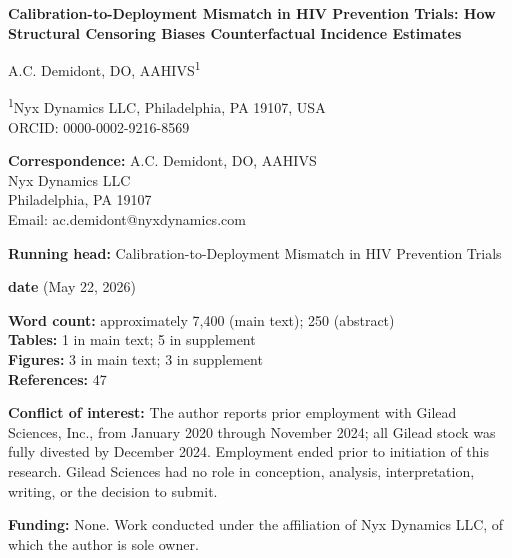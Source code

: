 \documentclass[12pt]{article}
\begin{document}
\thispagestyle{empty}
\begin{center}
\vspace*{0.5in}

{\Large \bfseries Calibration-to-Deployment Mismatch in HIV Prevention Trials: How Structural Censoring Biases Counterfactual Incidence Estimates}

\vspace{0.4in}

A.C. Demidont, DO, AAHIVS\textsuperscript{1}

\vspace{0.2in}

\small
\textsuperscript{1}Nyx Dynamics LLC, Philadelphia, PA 19107, USA \\
ORCID: 0000-0002-9216-8569

\vspace{0.3in}

\textbf{Correspondence:} A.C. Demidont, DO, AAHIVS \\
Nyx Dynamics LLC \\
Philadelphia, PA 19107 \\
Email: ac.demidont@nyxdynamics.com

\vspace{0.3in}

\textbf{Running head:} Calibration-to-Deployment Mismatch in HIV Prevention Trials

\vspace{0.2in}

\textbf{date} (May 22, 2026)

\vspace{0.2in}

\textbf{Word count:} approximately 7,400 (main text); 250 (abstract) \\
\textbf{Tables:} 1 in main text; 5 in supplement \\
\textbf{Figures:} 3 in main text; 3 in supplement \\
\textbf{References:} 47

\vspace{0.3in}

\textbf{Conflict of interest:} The author reports prior employment with Gilead Sciences, Inc., from January 2020 through November 2024; all Gilead stock was fully divested by December 2024. Employment ended prior to initiation of this research. Gilead Sciences had no role in conception, analysis, interpretation, writing, or the decision to submit.

\textbf{Funding:} None. Work conducted under the affiliation of Nyx Dynamics LLC, of which the author is sole owner.

\end{center}
\end{document}
